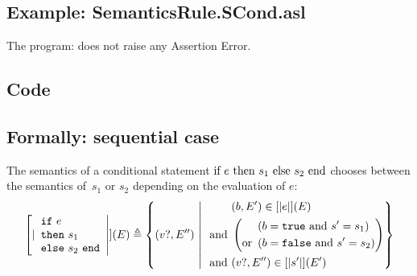 \documentclass{book}
\begin{document}
    \subsection{Example: SemanticsRule.SCond.asl}
    The program:
    does not raise any Assertion Error.

  \subsection{Code}

\begin{formal}
  \subsection{Formally: sequential case}
  The semantics of a conditional statement $\text{if}\ e\ \text{then}\ s_1\ \text{else}\ s_2\ \text{end}$ chooses between
  the semantics of~$s_1$ or $s_2$ depending on the evaluation of $e$:
  \begin{align}
    \left[| \begin{array}{l}
      \mathtt{if}\ e\\
      \mathtt{then}\ s_1\\
      \mathtt{else}\ s_2\ \mathtt{end}
    \end{array} \right|] (E) \triangleq
      \left\{ (v?, E'') \ \middle|\ {} \
      \begin{aligned}
        & (b, E') \in \left[| e \right|] (E)
        \\ \text{and}\ &
        \left( \begin{aligned}
          & \left(b = \mathtt{true} \ \text{and} \ s' = s_1 \right)
          \\ \text{or}\ &
          \left( b = \mathtt{false} \ \text{and}\ s' = s_2 \right)
        \end{aligned} \right)
        \\ \text{and}\ &
        (v?, E'') \in \left[| s' \right|] (E')
      \end{aligned}
      \right\}
    \label{eq:sem-seq-scond}
  \end{align}


\end{formal}
\end{document}
